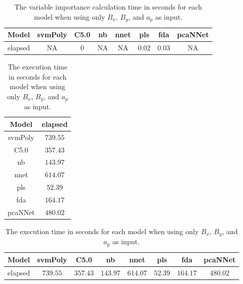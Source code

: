 \begin{table}[!ht]
	\centering
	\begin{tabular}{|c|c|c|c|c|c|c|c|}
		\hline
		Model & svmPoly & C5.0 & nb & nnet & pls & fda & pcaNNet \\ \hline
		elapsed & NA & $0$ & NA & NA & $0.02$ & $0.03$ & NA \\ \hline
	\end{tabular}
	\caption{The variable importance calculation time in seconds for each model when using only $B_{x}$, $B_{y}$, and $a_{p}$ as input.}
	\label{tab:time:reverse:xyap:importance}
\end{table}

\begin{table}[!ht]
	\centering
	\begin{tabular}{|c|c|}
		\hline
		Model & elapsed \\ \hline
		svmPoly & $739.55$ \\ \hline
		C5.0 & $357.43$ \\ \hline
		nb & $143.97$ \\ \hline
		nnet & $614.07$ \\ \hline
		pls & $52.39$ \\ \hline
		fda & $164.17$ \\ \hline
		pcaNNet & $480.02$ \\ \hline
	\end{tabular}
	\caption{The execution time in seconds for each model when using only $B_{x}$, $B_{y}$, and $a_{p}$ as input.}
	\label{tab:time:xyap:total}
\end{table}

\begin{table}[!ht]
	\centering
	\begin{tabular}{|c|c|c|c|c|c|c|c|}
		\hline
		Model & svmPoly & C5.0 & nb & nnet & pls & fda & pcaNNet \\ \hline
		elapsed & $739.55$ & $357.43$ & $143.97$ & $614.07$ & $52.39$ & $164.17$ & $480.02$ \\ \hline
	\end{tabular}
	\caption{The execution time in seconds for each model when using only $B_{x}$, $B_{y}$, and $a_{p}$ as input.}
	\label{tab:time:reverse:xyap:total}
\end{table}

